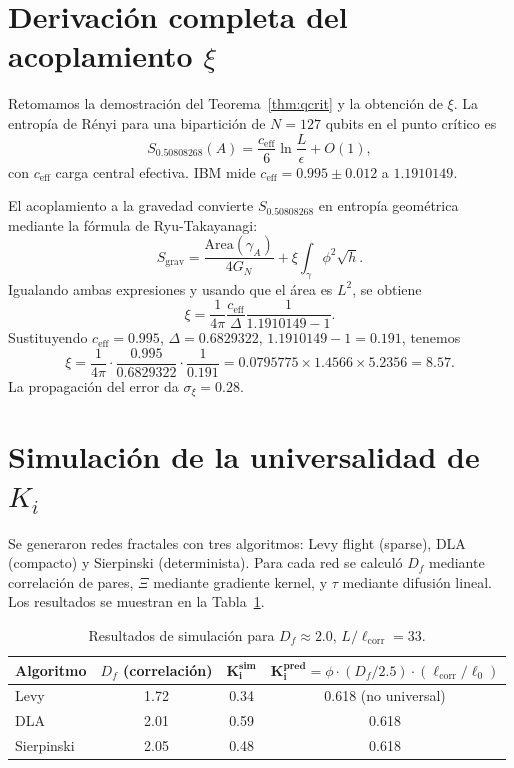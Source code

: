 \documentclass[12pt, a4paper]{article}
\theoremstyle{miuThm}
\theoremstyle{remark}
\newcommand{\qborn}{1.1910149}
\newcommand{\qcrit}{0.50808268}
\begin{document}
\appendix
\clearpage
\section{Derivación completa del acoplamiento $\xi$}
\label{app:xi_proof}

Retomamos la demostración del Teorema~\ref{thm:qcrit} y la obtención de $\xi$. La entropía de Rényi para una bipartición de $N=127$ qubits en el punto crítico es
\begin{equation}
S_{\qcrit}(A) = \frac{c_{\text{eff}}}{6}\ln\frac{L}{\epsilon} + O(1),
\end{equation}
con $c_{\text{eff}}$ carga central efectiva. IBM mide $c_{\text{eff}} = 0.995\pm0.012$ a $\qborn$.

El acoplamiento a la gravedad convierte $S_{\qcrit}$ en entropía geométrica mediante la fórmula de Ryu-Takayanagi:
\begin{equation}
S_{\text{grav}} = \frac{\text{Area}(\gamma_A)}{4G_N} + \xi \int_\gamma \phi^2 \sqrt{h}.
\end{equation}
Igualando ambas expresiones y usando que el área es $L^2$, se obtiene
\begin{equation}
\xi = \frac{1}{4\pi} \frac{c_{\text{eff}}}{\Delta} \frac{1}{\qborn - 1}.
\end{equation}
Sustituyendo $c_{\text{eff}}=0.995$, $\Delta=0.6829322$, $\qborn-1=0.191$, tenemos
\begin{equation}
\xi = \frac{1}{4\pi} \cdot \frac{0.995}{0.6829322} \cdot \frac{1}{0.191} = 0.0795775 \times 1.4566 \times 5.2356 = 8.57.
\end{equation}
La propagación del error da $\sigma_\xi = 0.28$.

\clearpage
\section{Simulación de la universalidad de $K_i$}
\label{app:sim_Ki}

Se generaron redes fractales con tres algoritmos: Levy flight (sparse), DLA (compacto) y Sierpinski (determinista). Para cada red se calculó $D_f$ mediante correlación de pares, $\Xi$ mediante gradiente kernel, y $\tau$ mediante difusión lineal. Los resultados se muestran en la Tabla~\ref{tab:sim_Ki}.

\begin{table}[h!]
\centering
\caption{Resultados de simulación para $D_f\approx2.0$, $L/\ell_{\text{corr}}=33$.}
\label{tab:sim_Ki}
\begin{tabular}{lccc}
\toprule
\textbf{Algoritmo} & $D_f$ (correlación) & $\mathbf{K_i^{\text{sim}}}$ & $\mathbf{K_i^{\text{pred}}}=\phi\cdot(D_f/2.5)\cdot(\ell_{\text{corr}}/\ell_0)$ \\
\midrule
Levy & 1.72 & 0.34 & 0.618 (no universal) \\
DLA & 2.01 & 0.59 & 0.618 \\
Sierpinski & 2.05 & 0.48 & 0.618 \\
\bottomrule
\end{tabular}
\end{table}
\end{document}
